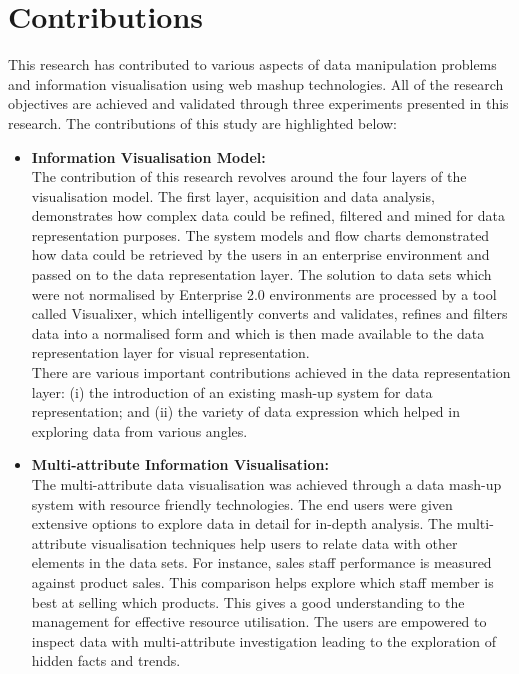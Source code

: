 \section{Contributions}

This research has contributed to various aspects of data manipulation problems and information visualisation using web mashup technologies. All of the research objectives are achieved and validated through three experiments presented in this research. The contributions of this study are highlighted below:

\begin{itemize}

\item \textbf{Information Visualisation Model:}\\

The contribution of this research revolves around the four layers of the visualisation model. The first layer, acquisition and data analysis, demonstrates how complex data could be refined, filtered and mined for data representation purposes. The system models and flow charts demonstrated how data could be retrieved by the users in an enterprise environment and passed on to the data representation layer. The solution to data sets which were not normalised by Enterprise 2.0 environments are processed by a tool called Visualixer, which intelligently converts and validates, refines and filters data into a normalised form and which is then made available to the data representation layer for visual representation. \\

There are various important contributions achieved in the data representation layer:  (i) the introduction of an existing mash-up system for data representation; and (ii) the variety of data expression which helped in exploring data from various angles.\\

\item \textbf{Multi-attribute Information Visualisation:} \\
The multi-attribute data visualisation was achieved through a data mash-up system with resource friendly technologies. The end users were given extensive options to explore data in detail for in-depth analysis. The multi-attribute visualisation techniques help users to relate data with other elements in the data sets. For instance, sales staff performance is measured against product sales. This comparison helps explore which staff member is best at selling which products. This gives a good understanding to the management for effective resource utilisation. The users are empowered to inspect data with multi-attribute investigation leading to the exploration of hidden facts and trends.\\


\end{itemize}

